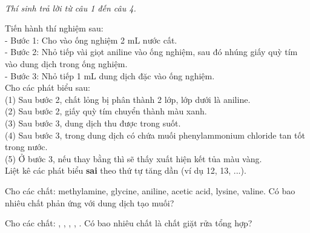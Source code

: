 \documentclass[11pt,a4paper]{article}
\begin{document}
\vspace{6pt}
 \\
\textit{Thí sinh trả lời từ câu 1 đến câu 4.}
\vspace{4pt}

\begin{ex}
Tiến hành thí nghiệm sau:\\
- Bước 1: Cho vào ống nghiệm 2 mL nước cất.\\
- Bước 2: Nhỏ tiếp vài giọt aniline vào ống nghiệm, sau đó nhúng giấy quỳ tím vào dung dịch trong ống nghiệm.\\
- Bước 3: Nhỏ tiếp 1 mL dung dịch  đặc vào ống nghiệm.\\
Cho các phát biểu sau:\\
(1) Sau bước 2, chất lỏng bị phân thành 2 lớp, lớp dưới là aniline.\\
(2) Sau bước 2, giấy quỳ tím chuyển thành màu xanh.\\
(3) Sau bước 3, dung dịch thu được trong suốt.\\
(4) Sau bước 3, trong dung dịch có chứa muối phenylammonium chloride tan tốt trong nước.\\
(5) Ở bước 3, nếu thay  bằng  thì sẽ thấy xuất hiện kết tủa màu vàng.\\
Liệt kê các phát biểu \textbf{sai} theo thứ tự tăng dần (ví dụ 12, 13, ...).
\end{ex}

\begin{ex}
Cho các chất: methylamine, glycine, aniline, acetic acid, lysine, valine. Có bao nhiêu chất phản ứng với dung dịch  tạo muối?
\end{ex}

\begin{ex}
Cho các chất: , , , , . Có bao nhiêu chất là chất giặt rửa tổng hợp?
\end{ex}
\end{document}
